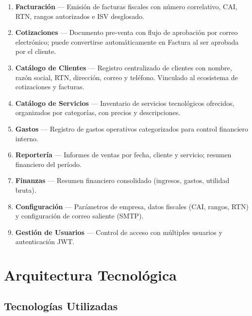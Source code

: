 \documentclass[12pt, letterpaper]{article}
\begin{document}
\begin{enumerate}[label=\textbf{\arabic*.}]
  \item \textbf{Facturación} --- Emisión de facturas fiscales con número
        correlativo, CAI, RTN, rangos autorizados e ISV desglosado.
  \item \textbf{Cotizaciones} --- Documento pre-venta con flujo de aprobación
        por correo electrónico; puede convertirse automáticamente en Factura
        al ser aprobada por el cliente.
  \item \textbf{Catálogo de Clientes} --- Registro centralizado de clientes
        con nombre, razón social, RTN, dirección, correo y teléfono.
        Vinculado al ecosistema de cotizaciones y facturas.
  \item \textbf{Catálogo de Servicios} --- Inventario de servicios tecnológicos
        ofrecidos, organizados por categorías, con precios y descripciones.
  \item \textbf{Gastos} --- Registro de gastos operativos categorizados para
        control financiero interno.
  \item \textbf{Reportería} --- Informes de ventas por fecha, cliente y
        servicio; resumen financiero del período.
  \item \textbf{Finanzas} --- Resumen financiero consolidado (ingresos,
        gastos, utilidad bruta).
  \item \textbf{Configuración} --- Parámetros de empresa, datos fiscales
        (CAI, rangos, RTN) y configuración de correo saliente (SMTP).
  \item \textbf{Gestión de Usuarios} --- Control de acceso con múltiples
        usuarios y autenticación JWT.
\end{enumerate}

\section{Arquitectura Tecnológica}

\subsection{Tecnologías Utilizadas}
\end{document}
